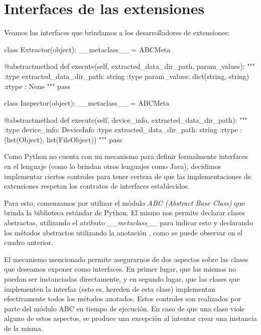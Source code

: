 \section{Interfaces de las extensiones}
\label{interfacesDeExtension}
Veamos las interfaces que brindamos a los desarrolladores de extensiones:
\newline

\begin{python}[title=Interfaces brindadas a los desarrolladores, captionpos=b]
class Extractor(object):
    __metaclass__ = ABCMeta

    @abstractmethod
    def execute(self, extracted_data_dir_path, param_values):
        """
        :type extracted_data_dir_path: string
        :type param_values: dict(string, string)
        :rtype : None
        """
        pass

class Inspector(object):
    __metaclass__ = ABCMeta

    @abstractmethod
    def execute(self, device_info, extracted_data_dir_path):
        """
        :type device_info: DeviceInfo
        :type extracted_data_dir_path: string
        :rtype : (list(Object), list(FileObject))
        """
        pass

\end{python}

Como Python no cuenta con un mecanismo para definir formalmente interfaces en el lenguaje (como lo brindan otros lenguajes como Java), decidimos implementar ciertos controles para tener certeza de que las implementaciones de extensiones respetan los contratos de interfaces establecidos.

Para esto, comenzamos por utilizar el módulo \emph{ABC (Abstract Base Class)} que brinda la biblioteca estándar de Python. El mismo nos permite declarar clases abstractas, utilizando el atributo \emph{\_\_metaclass\_\_} para indicar esto y declarando los métodos abstractos utilizando la anotación \emph{\@abstractmethod}, como se puede observar en el cuadro anterior.

El mecanismo mencionado permite asegurarnos de dos aspectos sobre las clases que deseamos exponer como interfaces. En primer lugar, que las mismas no puedan ser instanciadas directamente, y en segundo lugar, que las clases que implementen la interfaz (esto es, hereden de esta clase) implementan efectivamente todos los métodos anotados. Estos controles son realizados por parte del módulo ABC en tiempo de ejecución. En caso de que una clase viole alguno de estos aspectos, se produce una excepción al intentar crear una instancia de la misma.

